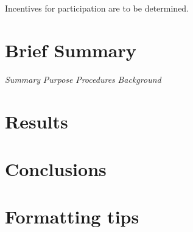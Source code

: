 \documentclass[english]{proposalnsf}
\begin{document}
Incentives for participation are to be determined.

\section{Brief Summary}
{\em Summary}
{\em Purpose}
{\em Procedures}
{\em Background}


\section{Results}
\label{results}


\section{Conclusions}
\label{conclusions}






\appendix
\section{Formatting tips}
\end{document}
